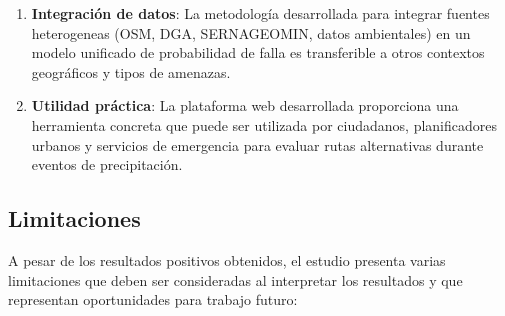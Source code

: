 \documentclass[conference]{IEEEtran}
\begin{document}
\begin{enumerate}
    \item \textbf{Integración de datos}: La metodología desarrollada para integrar fuentes heterogeneas (OSM, DGA, SERNAGEOMIN, datos ambientales) en un modelo unificado de probabilidad de falla es transferible a otros contextos geográficos y tipos de amenazas.

    \item \textbf{Utilidad práctica}: La plataforma web desarrollada proporciona una herramienta concreta que puede ser utilizada por ciudadanos, planificadores urbanos y servicios de emergencia para evaluar rutas alternativas durante eventos de precipitación.
\end{enumerate}

\subsection{Limitaciones}

A pesar de los resultados positivos obtenidos, el estudio presenta varias limitaciones que deben ser consideradas al interpretar los resultados y que representan oportunidades para trabajo futuro:
\end{document}
